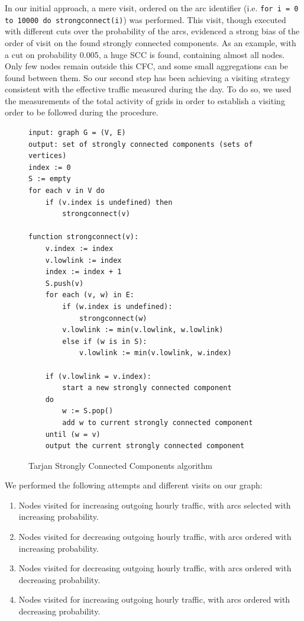 \documentclass[12pt,a4paper]{article}
\begin{document}
In our initial approach, a mere visit, ordered on the arc identifier (i.e. \texttt{for i = 0 to 10000 do strongconnect(i)}) was performed. This visit, though executed with different cuts over the probability of the arcs, evidenced
a strong bias of the order of visit on the found strongly connected components.
As an example, with a cut on probability 0.005, a huge SCC is found, containing almost all nodes. Only few nodes remain
outside this CFC, and some small aggregations can be found between them.
So our second step has been achieving a visiting strategy consistent with the effective traffic measured during the day.
To do so, we used the measurements of the total activity of grids in order to establish a visiting order to be 
followed during the procedure.
\begin{figure}
\begin{verbatim}
input: graph G = (V, E)
output: set of strongly connected components (sets of vertices)
index := 0
S := empty
for each v in V do
    if (v.index is undefined) then
        strongconnect(v)
		
function strongconnect(v):
    v.index := index
    v.lowlink := index
    index := index + 1
    S.push(v)
    for each (v, w) in E:
        if (w.index is undefined):
            strongconnect(w)
        v.lowlink := min(v.lowlink, w.lowlink)
		else if (w is in S):
            v.lowlink := min(v.lowlink, w.index)
    
    if (v.lowlink = v.index):
        start a new strongly connected component
    do
        w := S.pop()
        add w to current strongly connected component
    until (w = v)
    output the current strongly connected component
\end{verbatim}
\caption{Tarjan Strongly Connected Components algorithm}
\label{alg:tarjan}
\end{figure}
We performed the following attempts and different visits on our graph:
\begin{enumerate}
\item Nodes visited for increasing outgoing hourly traffic, with arcs selected with increasing probability. 
\item Nodes visited for decreasing outgoing hourly traffic, with arcs ordered with increasing probability.
\item Nodes visited for decreasing outgoing hourly traffic, with arcs ordered with decreasing probability.
\item Nodes visited for increasing outgoing hourly traffic, with arcs ordered with decreasing probability.
\end{enumerate}
\end{document}
